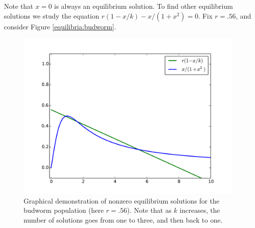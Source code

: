 Note that $x = 0$ is always an equilibrium solution.  To find other equilibrium solutions we study the equation $r(1-x/k)-x/(1+x^2) = 0$.  Fix $r = .56$, and consider Figure \eqref{equilibria:budworm}. 

\begin{figure}[ht]
\centering
\includegraphics[width=\textwidth]{BudwormEquilibria.pdf}
\caption{Graphical demonstration of nonzero equilibrium solutions for the budworm population (here $r = .56$). Note that as $k$ increases, the number of solutions goes from one to three, and then back to one. }
\label{equilibria:budworm}
\end{figure}

